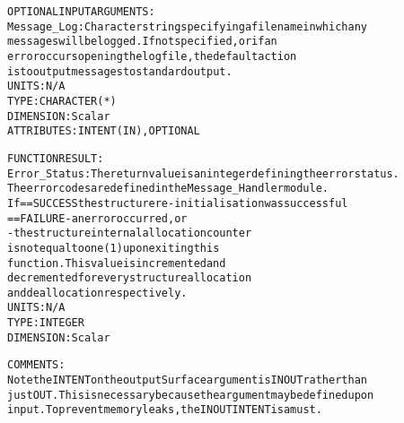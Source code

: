 \begin{alltt}
 
  OPTIONAL INPUT ARGUMENTS:
        Message_Log:  Character string specifying a filename in which any
                      messages will be logged. If not specified, or if an
                      error occurs opening the log file, the default action
                      is to output messages to standard output.
                      UNITS:      N/A
                      TYPE:       CHARACTER(*)
                      DIMENSION:  Scalar
                      ATTRIBUTES: INTENT(IN), OPTIONAL
 
  FUNCTION RESULT:
        Error_Status: The return value is an integer defining the error status.
                      The error codes are defined in the Message_Handler module.
                      If == SUCCESS the structure re-initialisation was successful
                         == FAILURE - an error occurred, or
                                    - the structure internal allocation counter
                                      is not equal to one (1) upon exiting this
                                      function. This value is incremented and
                                      decremented for every structure allocation
                                      and deallocation respectively.
                      UNITS:      N/A
                      TYPE:       INTEGER
                      DIMENSION:  Scalar
 
  COMMENTS:
        Note the INTENT on the output Surface argument is IN OUT rather than
        just OUT. This is necessary because the argument may be defined upon
        input. To prevent memory leaks, the IN OUT INTENT is a must.
 
  \end{alltt}
